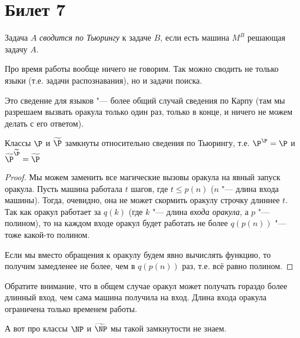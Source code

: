 \setcounter{section}{6}
\section{Билет 7}
	\begin{Def}
		Задача $A$ \textit{сводится по Тьюрингу} к задаче $B$, если есть машина $M^B$ решающая задачу $A$.
	\end{Def}
	\begin{Rem}
		Про время работы вообще ничего не говорим.
		Так можно сводить не только языки (т.е. задачи распознавания), но и задачи поиска.
	\end{Rem}
	\begin{Rem}
		Это сведение для языков "--- более общий случай сведения по Карпу (там мы разрешаем вызвать оракула только один раз, только в конце, и ничего не можем делать с его ответом).
	\end{Rem}

	\begin{assertion}
		Классы $\P$ и $\widetilde{\P}$ замкнуты относительно сведения по Тьюрингу, т.е. $\P^{\P}=\P$ и $\widetilde\P^{\widetilde\P}=\widetilde\P$
	\end{assertion}
	\begin{proof}
		Мы можем заменить все магические вызовы оракула на явный запуск оракула.
		Пусть машина работала $t$ шагов, где $t \le p(n)$ ($n$ "--- длина входа машины).
		Тогда, очевидно, она не может скормить оракулу строчку длиннее $t$.
		Так как оракул работает за $q(k)$ (где $k$ "--- длина \textit{входа оракула}, а $p$ "--- полином),
		то на каждом входе оракул будет работать не более $q(p(n))$ "--- тоже какой-то полином.

		Если мы вместо обращения к оракулу будем явно вычислять функцию, то получим замедленее не более, чем в $q(p(n))$ раз,
		т.е. всё равно полином.
	\end{proof}
	\begin{Rem}
		Обратите внимание, что в общем случае оракул может получать гораздо более длинный вход, чем сама машина получила на вход.
		Длина входа оракула ограничена только временем работы.
	\end{Rem}
	\begin{Rem}
		А вот про классы $\NP$ и $\widetilde{\NP}$ мы такой замкнутости не знаем.
	\end{Rem}

